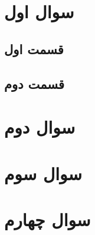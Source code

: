 \documentclass[]{article}
\begin{document}
\printheader

\section*{سوال اول}
\subsection*{قسمت اول}
\subsection*{قسمت دوم}
\section*{سوال دوم}
\section*{سوال سوم}
\section*{سوال چهارم}
\end{document}

